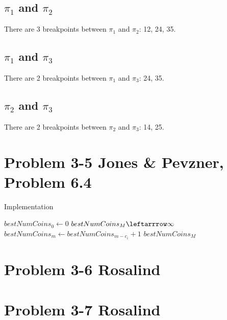 \documentclass{article}
\begin{document}
\subsection*{$\pi_1$ and $\pi_2$}

There are 3 breakpoints between $\pi_1$ and $\pi_2$: 12, 24, 35.

\subsection*{$\pi_1$ and $\pi_3$}

There are 2 breakpoints between $\pi_1$ and $\pi_3$: 24, 35.

\subsection*{$\pi_2$ and $\pi_3$}

There are 2 breakpoints between $\pi_2$ and $\pi_3$: 14, 25.

\section*{Problem 3-5 Jones \& Pevzner, Problem 6.4}

\begin{algorithm}[H]
\caption{Implementation}
\begin{algorithmic}[1]
 \State $bestNumCoins_0 \leftarrow 0$
 \State $bestNumCoins_M \leftarrrow \infty$
     \State $bestNumCoins_m \leftarrow bestNumCoins_{m-c_i} + 1$
    \EndIf
   \EndIf
  \EndFor
 \EndFor
 \State \Return $bestNumCoins_M$
\EndFucntion
\end{algorithmic}
\end{algorithm}

\section*{Problem 3-6 Rosalind}

\section*{Problem 3-7 Rosalind}
\end{document}
